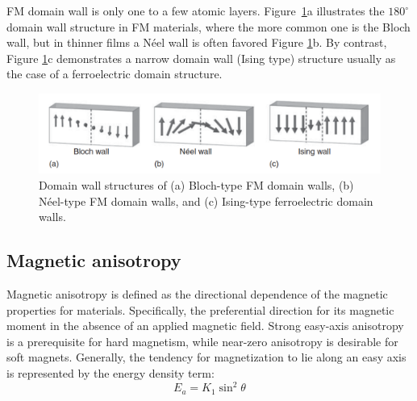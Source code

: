 FM domain wall is only one to a few atomic layers. Figure~\ref{fig:wall_structure}a illustrates the $180  ^\circ$ domain wall structure in FM materials, where the more common one is the Bloch wall, but in thinner films a Néel wall is often favored Figure \ref{fig:wall_structure}b. By contrast, Figure \ref{fig:wall_structure}c demonstrates a narrow domain wall (Ising type) structure usually as the case of a ferroelectric domain structure.

\begin{figure}[H]
\centering
\captionsetup{justification=centering,margin=2cm}
	\includegraphics[width=150mm]{fig/review/wall_structure.png}
	\caption[Domain wall structures.]{Domain wall structures of (a) Bloch-type FM domain walls, (b) Néel-type FM domain walls, and (c) Ising-type ferroelectric domain walls.}
\label{fig:wall_structure}
\end{figure}

\subsection{Magnetic anisotropy}
Magnetic anisotropy is defined as the directional dependence of the magnetic
properties for materials. Specifically, the preferential direction for its magnetic moment in the absence of an applied magnetic field. Strong easy-axis anisotropy is a prerequisite for hard magnetism, while near-zero anisotropy is desirable for soft magnets.
Generally, the tendency for magnetization to lie along an easy axis is represented by the energy
density term:
\begin{equation}
E_a = K_1 \sin^2 \theta
\end{equation}

